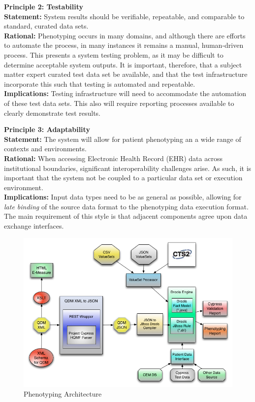 \documentclass{amia}
\begin{document}
\textbf{Principle 2: Testability}\\
\textbf{Statement:} System results should be verifiable, repeatable, and comparable to standard, curated data sets.\\
\textbf{Rational:} Phenotyping occurs in many domains, and although there are efforts to automate the process\cite{chung2008automated,kyzar2011towards}, in many instances it remains a manual, human-driven process\cite{tao2013phenotyping}. This presents a system testing problem, as it may be difficult to determine acceptable system outputs. It is important, therefore, that a subject matter expert curated test data set be available, and that the test infrastructure incorporate this such that testing is automated and repeatable.\\
\textbf{Implications:} Testing infrastructure will need to accommodate the automation of these test data sets. This also will require reporting processes available to clearly demonstrate test results.

\textbf{Principle 3: Adaptability}\\
\textbf{Statement:} The system will allow for patient phenotyping an a wide range of contexts and environments.\\
\textbf{Rational:} When accessing Electronic Health Record (EHR) data across institutional boundaries, significant interoperability challenges arise\cite{chute2011sharpn}. As such, it is important that the system not be coupled to a particular data set or execution environment.\\
\textbf{Implications:} Input data types need to be as general as possible, allowing for \textit{late binding} of the source data format to the phenotyping data execution format. The main requirement of this style is that adjacent components agree upon data exchange interfaces. 

\begin{figure}
\includegraphics[width=\textwidth]{htp-drools-arch}
\caption{Phenotyping Architecture} 
\label{fig:overall_arch}
\end{figure}
\end{document}
